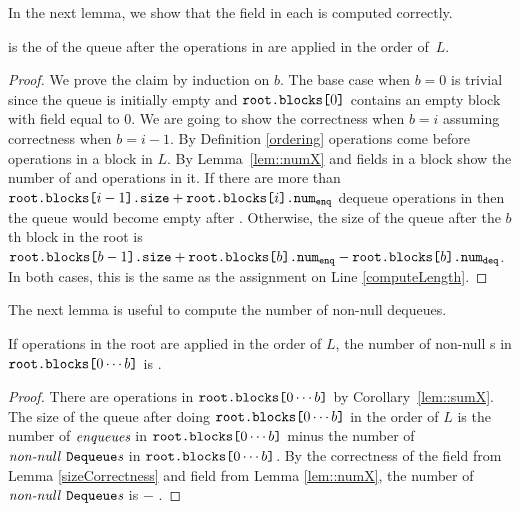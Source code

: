 In the next lemma, we show that the  field in each  is computed correctly.
\begin{lemma}\label{sizeCorrectness}
  is the \size of the queue after the operations in  are applied in the order of~$L$.  
\end{lemma}
\begin{proof}
We prove the claim by induction on $b$. The base case when ${b=0}$ is trivial since the queue is initially empty and $\nf{root.blocks[}0\nf{]}$ contains an empty block with  field equal to $0$. We are going to show the correctness when $b=i$ assuming  correctness when $b=i-1$. By Definition \ref{ordering}  operations come before  operations in a block in $L$. By Lemma~\ref{lem::numX}  and  fields in a block show the number of  and  operations in it. If there are more than $\nf{root.blocks[}i-1\nf{].size}+\nf{root.blocks[}i\nf{].num\sub{enq}}$ dequeue operations in  then the queue would become empty after . Otherwise, the size of the queue after the $b$th block in the root is $\nf{root.blocks[}b-1\nf{].size}+ \nf{root.blocks[}b\nf{].num\sub{enq}}- \nf{root.blocks[}b\nf{].num\sub{deq}}$. In both cases, this is the same as the assignment on Line \ref{computeLength}.
\end{proof}

The next lemma is useful to compute the number of non-null dequeues.
\begin{lemma} \label{numberOfNND}
If operations in the root are applied in the order of $L$, the number of non-null s in $\nf{root.blocks[}0\cdots b\nf{]}$ is .
\end{lemma}
\begin{proof}
There are   operations in $\nf{root.blocks[}0\cdots b\nf{]}$ by Corollary~\ref{lem::sumX}. The size of the queue after doing $\nf{root.blocks[}0\cdots b\nf{]}$ in the order of $L$ is 
the number of $\it{enqueues}$ in $\nf{root.blocks[}0\cdots b\nf{]}$ minus the number of $\it{non-null \nf{Dequeue}s}$ in $\nf{root.blocks[}0\cdots b\nf{]}$. By the correctness of the  field from Lemma \ref{sizeCorrectness} and  field from Lemma \ref{lem::numX}, the number of $\it{non-null \nf{Dequeue}s}$ is  $-$ . 
\end{proof}

